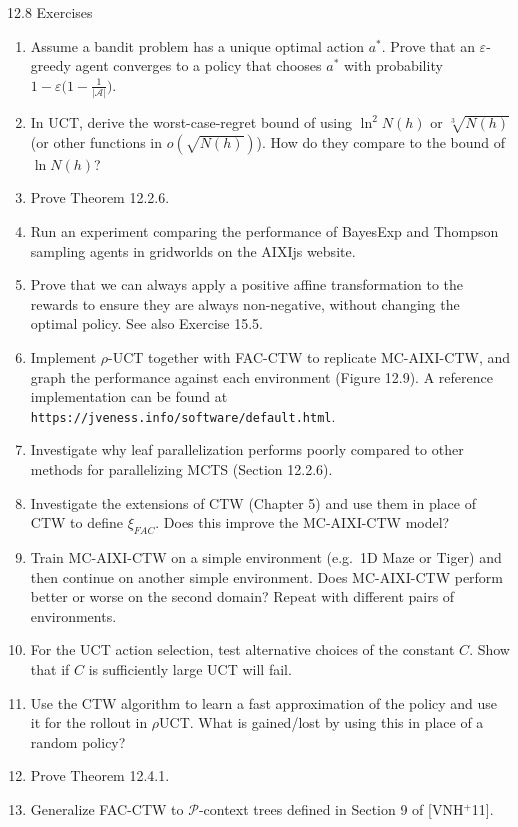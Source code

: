 \documentclass[aspectratio=169,10pt]{beamer}
\newcommand{\Acal}{\mathcal{A}}
\begin{document}
\begin{frame}[allowframebreaks]{12.8 Exercises}
\begin{enumerate}
\item[1.] [C07] Assume a bandit problem has a unique optimal action $a^*$. Prove that an
$\varepsilon$-greedy agent converges to a policy that chooses $a^*$ with probability
$1-\varepsilon\big(1-\tfrac1{|\Acal|}\big)$.
\item[2.] [C25] In UCT, derive the worst-case-regret bound of using $\ln^2 N(h)$ or
$\sqrt[3]{N(h)}$ (or other functions in $o(\sqrt{N(h)})$). How do they compare to the
bound of $\ln N(h)$?
\item[3.] [C30] Prove Theorem 12.2.6.
\item[4.] [C15] Run an experiment comparing the performance of BayesExp and Thompson
sampling agents in gridworlds on the AIXIjs website.
\item[5.] [C12] Prove that we can always apply a positive affine transformation to the
rewards to ensure they are always non-negative, without changing the optimal policy. See
also Exercise 15.5.
\item[6.] [C25] Implement $\rho$-UCT together with FAC-CTW to replicate MC-AIXI-CTW, and
graph the performance against each environment (Figure 12.9). A reference implementation
can be found at \texttt{https://jveness.info/software/default.html}.
\item[7.] [C25] Investigate why leaf parallelization performs poorly compared to other
methods for parallelizing MCTS (Section 12.2.6).
\item[8.] [C28] Investigate the extensions of CTW (Chapter 5) and use them in place of CTW
to define $\xi_{FAC}$. Does this improve the MC-AIXI-CTW model?
\item[9.] [C20] Train MC-AIXI-CTW on a simple environment (e.g.\ 1D Maze or Tiger) and
then continue on another simple environment. Does MC-AIXI-CTW perform better or worse on
the second domain? Repeat with different pairs of environments.
\item[10.] [C18] For the UCT action selection, test alternative choices of the constant
$C$. Show that if $C$ is sufficiently large UCT will fail.
\item[11.] [C20] Use the CTW algorithm to learn a fast approximation of the policy and
use it for the rollout in $\rho$UCT. What is gained/lost by using this in place of a
random policy?
\item[12.] [C32] Prove Theorem 12.4.1.
\item[13.] [C25] Generalize FAC-CTW to $\mathcal{P}$-context trees defined in Section 9 of
[VNH$^+$11].
\end{enumerate}
\end{frame}
\end{document}
